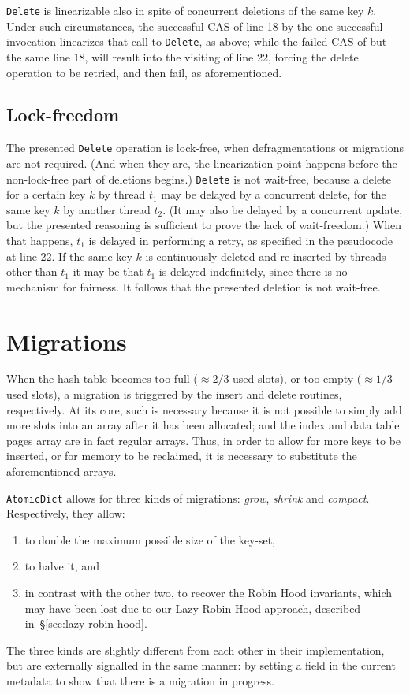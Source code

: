 \texttt{Delete} is linearizable also in spite of concurrent deletions of the same key $k$.
Under such circumstances, the successful CAS of line 18 by the one successful invocation linearizes that call to \texttt{Delete}, as above; while the failed CAS of but the same line 18, will result into the visiting of line 22, forcing the delete operation to be retried, and then fail, as aforementioned.


\subsection{Lock-freedom}\label{subsec:delete-lock-freedom}

The presented \texttt{Delete} operation is lock-free, when defragmentations or migrations are not required.
(And when they are, the linearization point happens before the non-lock-free part of deletions begins.)
\texttt{Delete} is not wait-free, because a delete for a certain key $k$ by thread $t_1$ may be delayed by a concurrent delete, for the same key $k$ by another thread $t_2$.
(It may also be delayed by a concurrent update, but the presented reasoning is sufficient to prove the lack of wait-freedom.)
When that happens, $t_1$ is delayed in performing a retry, as specified in the pseudocode at line 22.
If the same key $k$ is continuously deleted and re-inserted by threads other than $t_1$ it may be that $t_1$ is delayed indefinitely, since there is no mechanism for fairness.
It follows that the presented deletion is not wait-free.


\section{Migrations}\label{sec:migrations}

When the hash table becomes too full ($\approx 2/3$ used slots), or too empty ($\approx 1/3$ used slots), a migration is triggered by the insert and delete routines, respectively.
At its core, such is necessary because it is not possible to simply add more slots into an array after it has been allocated; and the index and data table pages array are in fact regular arrays.
Thus, in order to allow for more keys to be inserted, or for memory to be reclaimed, it is necessary to substitute the aforementioned arrays.

\texttt{AtomicDict} allows for three kinds of migrations: \emph{grow}, \emph{shrink} and \emph{compact}.
Respectively, they allow:
\begin{enumerate}
	\item to double the maximum possible size of the key-set,
	\item to halve it, and
	\item in contrast with the other two, to recover the Robin Hood invariants, which may have been lost due to our Lazy Robin Hood approach, described in~\S\ref{sec:lazy-robin-hood}.
\end{enumerate}
The three kinds are slightly different from each other in their implementation, but are externally signalled in the same manner: by setting a field in the current metadata to show that there is a migration in progress.

